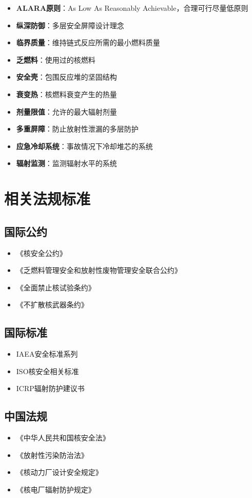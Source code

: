 \documentclass[12pt,UTF8]{ctexbook}
\begin{document}
\begin{itemize}[leftmargin=2cm]
    \item \textbf{ALARA原则}：As Low As Reasonably Achievable，合理可行尽量低原则
    \item \textbf{纵深防御}：多层安全屏障设计理念
    \item \textbf{临界质量}：维持链式反应所需的最小燃料质量
    \item \textbf{乏燃料}：使用过的核燃料
    \item \textbf{安全壳}：包围反应堆的坚固结构
    \item \textbf{衰变热}：核燃料衰变产生的热量
    \item \textbf{剂量限值}：允许的最大辐射剂量
    \item \textbf{多重屏障}：防止放射性泄漏的多层防护
    \item \textbf{应急冷却系统}：事故情况下冷却堆芯的系统
    \item \textbf{辐射监测}：监测辐射水平的系统
\end{itemize}

\chapter{相关法规标准}

\section{国际公约}
\begin{itemize}[leftmargin=2cm]
    \item 《核安全公约》
    \item 《乏燃料管理安全和放射性废物管理安全联合公约》
    \item 《全面禁止核试验条约》
    \item 《不扩散核武器条约》
\end{itemize}

\section{国际标准}
\begin{itemize}[leftmargin=2cm]
    \item IAEA安全标准系列
    \item ISO核安全相关标准
    \item ICRP辐射防护建议书
\end{itemize}

\section{中国法规}
\begin{itemize}[leftmargin=2cm]
    \item 《中华人民共和国核安全法》
    \item 《放射性污染防治法》
    \item 《核动力厂设计安全规定》
    \item 《核电厂辐射防护规定》
\end{itemize}
\end{document}
